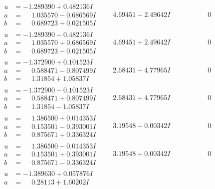 \documentclass[1p]{elsarticle_modified}
\theoremstyle{definition}
\begin{document}
$$\begin{array}{c|c|c}
\begin{aligned}
u &= -1.289390 + 0.482136 I \\
a &= \phantom{-}1.035570 - 0.686569 I \\
b &= \phantom{-}0.689723 + 0.021505 I\end{aligned}
 & \phantom{-}4.69451 - 2.49642 I & \phantom{-0.000000 } 0 \\ \hline\begin{aligned}
u &= -1.289390 - 0.482136 I \\
a &= \phantom{-}1.035570 + 0.686569 I \\
b &= \phantom{-}0.689723 - 0.021505 I\end{aligned}
 & \phantom{-}4.69451 + 2.49642 I & \phantom{-0.000000 } 0 \\ \hline\begin{aligned}
u &= -1.372900 + 0.101523 I \\
a &= \phantom{-}0.588471 - 0.807499 I \\
b &= \phantom{-}1.31854 + 1.05837 I\end{aligned}
 & \phantom{-}2.68431 - 4.77965 I & \phantom{-0.000000 } 0 \\ \hline\begin{aligned}
u &= -1.372900 - 0.101523 I \\
a &= \phantom{-}0.588471 + 0.807499 I \\
b &= \phantom{-}1.31854 - 1.05837 I\end{aligned}
 & \phantom{-}2.68431 + 4.77965 I & \phantom{-0.000000 } 0 \\ \hline\begin{aligned}
u &= \phantom{-}1.386500 + 0.014353 I \\
a &= \phantom{-}0.153501 - 0.393001 I \\
b &= \phantom{-}0.875671 + 0.336324 I\end{aligned}
 & \phantom{-}3.19548 - 0.00342 I & \phantom{-0.000000 } 0 \\ \hline\begin{aligned}
u &= \phantom{-}1.386500 - 0.014353 I \\
a &= \phantom{-}0.153501 + 0.393001 I \\
b &= \phantom{-}0.875671 - 0.336324 I\end{aligned}
 & \phantom{-}3.19548 + 0.00342 I & \phantom{-0.000000 } 0 \\ \hline\begin{aligned}
u &= -1.389630 + 0.057876 I \\
a &= \phantom{-}0.28113 + 1.60202 I \\

\end{aligned}
\end{array}$$
\end{document}
